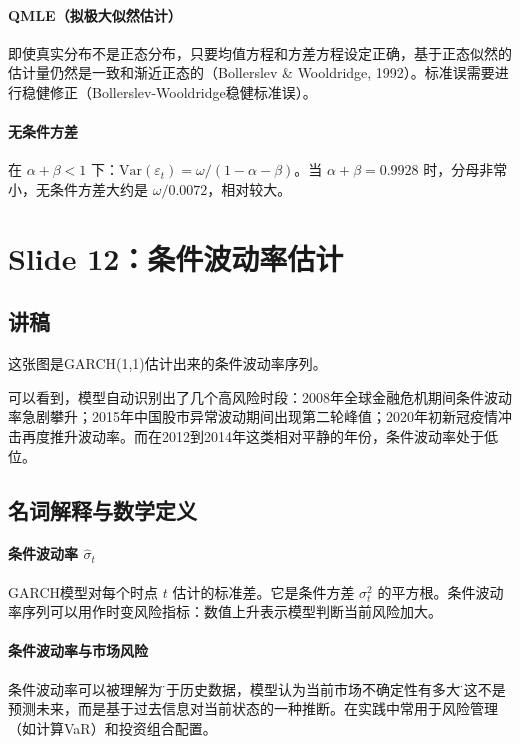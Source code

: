 \documentclass[11pt,a4paper]{article}
\begin{document}
\paragraph{QMLE（拟极大似然估计）} 即使真实分布不是正态分布，只要均值方程和方差方程设定正确，基于正态似然的估计量仍然是一致和渐近正态的（Bollerslev \& Wooldridge, 1992）。标准误需要进行稳健修正（Bollerslev-Wooldridge稳健标准误）。

\paragraph{无条件方差} 在 \(\alpha+\beta < 1\) 下：\(\text{Var}(\varepsilon_t) = \omega / (1-\alpha-\beta)\)。当 \(\alpha + \beta = 0.9928\) 时，分母非常小，无条件方差大约是 \(\omega / 0.0072\)，相对较大。

\newpage
\section*{Slide 12：条件波动率估计}

\subsection*{讲稿}
这张图是GARCH(1,1)估计出来的条件波动率序列。

可以看到，模型自动识别出了几个高风险时段：2008年全球金融危机期间条件波动率急剧攀升；2015年中国股市异常波动期间出现第二轮峰值；2020年初新冠疫情冲击再度推升波动率。而在2012到2014年这类相对平静的年份，条件波动率处于低位。

\subsection*{名词解释与数学定义}

\paragraph{条件波动率 \(\hat{\sigma}_t\)} GARCH模型对每个时点 \(t\) 估计的标准差。它是条件方差 \(\sigma_t^2\) 的平方根。条件波动率序列可以用作时变风险指标：数值上升表示模型判断当前风险加大。

\paragraph{条件波动率与市场风险} 条件波动率可以被理解为\"基于历史数据，模型认为当前市场不确定性有多大\"。这不是预测未来，而是基于过去信息对当前状态的一种推断。在实践中常用于风险管理（如计算VaR）和投资组合配置。
\end{document}

